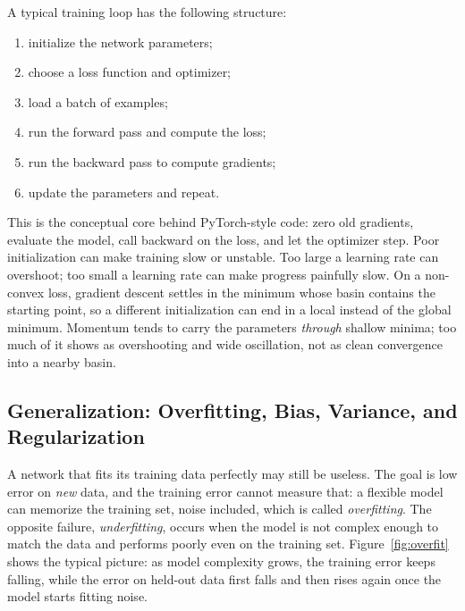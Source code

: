 A typical training loop has the following structure:
\begin{enumerate}
  \item initialize the network parameters;
  \item choose a loss function and optimizer;
  \item load a batch of examples;
  \item run the forward pass and compute the loss;
  \item run the backward pass to compute gradients;
  \item update the parameters and repeat.
\end{enumerate}
\noindent
This is the conceptual core behind PyTorch-style code: zero old gradients,
evaluate the model, call backward on the loss, and let the optimizer step.
Poor initialization can make training slow or unstable. Too large a learning
rate can overshoot; too small a learning rate can make progress painfully slow.
On a non-convex loss, gradient descent settles in the minimum whose basin
contains the starting point, so a different initialization can end in a local
instead of the global minimum. Momentum tends to carry the parameters
\emph{through} shallow minima; too much of it shows as overshooting and wide
oscillation, not as clean convergence into a nearby basin.

\subsection{Generalization: Overfitting, Bias, Variance, and Regularization}

A network that fits its training data perfectly may still be useless. The goal
is low error on \emph{new} data, and the training error cannot measure that:
a flexible model can memorize the training set, noise included, which is called
\emph{overfitting}. The opposite failure, \emph{underfitting}, occurs when the
model is not complex enough to match the data and performs poorly even on the
training set. Figure~\ref{fig:overfit} shows the typical picture: as model
complexity grows, the training error keeps falling, while the error on held-out
data first falls and then rises again once the model starts fitting noise.

